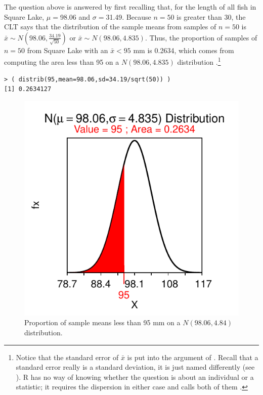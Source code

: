 \documentclass[10pt,openany]{book}\usepackage[]{graphicx}\usepackage[]{color}
\makeatletter
\newenvironment{kframe}{%
 \def\at@end@of@kframe{}%
 \ifinner\ifhmode%
  \def\at@end@of@kframe{\end{minipage}}%
  \begin{minipage}{\columnwidth}%
 \fi\fi%
 \def\FrameCommand##1{\hskip\@totalleftmargin \hskip-\fboxsep
 \colorbox{shadecolor}{##1}\hskip-\fboxsep
     \hskip-\linewidth \hskip-\@totalleftmargin \hskip\columnwidth}%
 \MakeFramed {\advance\hsize-\width
   \@totalleftmargin\z@ \linewidth\hsize
   \@setminipage}}%
 {\par\unskip\endMakeFramed%
 \at@end@of@kframe}
\newenvironment{knitrout}{}{} %
\makeatother
\begin{document}
The question above is answered by first recalling that, for the length of all fish in Square Lake, $\mu=$98.06 and $\sigma=$31.49.  Because $n=50$ is greater than 30, the CLT says that the distribution of the sample means from samples of $n=50$ is $\bar{x}\sim N(98.06,\frac{34.19}{\sqrt{50}})$ or $\bar{x}\sim N(98.06,4.835)$.  Thus, the proportion of samples of $n=50$ from Square Lake with an $\bar{x}<95$ mm is 0.2634, which comes from computing the area less than 95 on a $N(98.06,4.835)$ distribution .\footnote{Notice that the standard error of $\bar{x}$ is put into the  argument of .  Recall that a standard error really is a standard deviation, it is just named differently (see ).  R has no way of knowing whether the question is about an individual or a statistic; it requires the dispersion in either case and calls both of them .}

\begin{knitrout}
\color{fgcolor}\begin{kframe}
\begin{verbatim}
> ( distrib(95,mean=98.06,sd=34.19/sqrt(50)) )
[1] 0.2634127
\end{verbatim}
\end{kframe}\begin{figure}[hbtp]

{\centering \includegraphics[width=.4\linewidth]{Figs/NormTL95-1} 

}

\caption[Proportion of sample means less than 95 mm on a $N(98.06,4.84)$ distribution]{Proportion of sample means less than 95 mm on a $N(98.06,4.84)$ distribution.}\label{fig:NormTL95}
\end{figure}


\end{knitrout}

\end{document}
